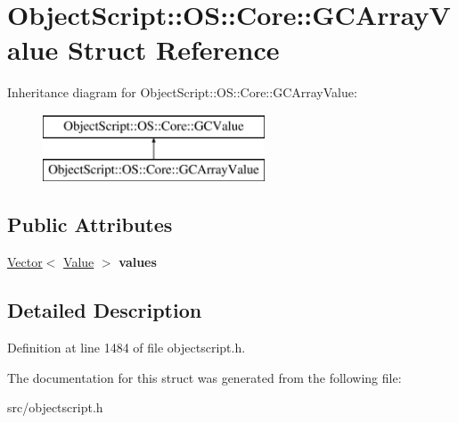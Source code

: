 \hypertarget{struct_object_script_1_1_o_s_1_1_core_1_1_g_c_array_value}{}\section{Object\+Script\+:\+:OS\+:\+:Core\+:\+:G\+C\+Array\+Value Struct Reference}
\label{struct_object_script_1_1_o_s_1_1_core_1_1_g_c_array_value}
Inheritance diagram for Object\+Script\+:\+:OS\+:\+:Core\+:\+:G\+C\+Array\+Value\+:\begin{figure}[H]
\begin{center}
\leavevmode
\includegraphics[height=2.000000cm]{struct_object_script_1_1_o_s_1_1_core_1_1_g_c_array_value}
\end{center}
\end{figure}
\subsection*{Public Attributes}
\begin{DoxyCompactItemize}
\item 
\hyperlink{struct_object_script_1_1_o_s_1_1_vector}{Vector}$<$ \hyperlink{struct_object_script_1_1_o_s_1_1_core_1_1_value}{Value} $>$ {\bfseries values}\hypertarget{struct_object_script_1_1_o_s_1_1_core_1_1_g_c_array_value_acbe276702726d52fe068c5518f9a7fb1}{}\label{struct_object_script_1_1_o_s_1_1_core_1_1_g_c_array_value_acbe276702726d52fe068c5518f9a7fb1}

\end{DoxyCompactItemize}


\subsection{Detailed Description}


Definition at line 1484 of file objectscript.\+h.



The documentation for this struct was generated from the following file\+:\begin{DoxyCompactItemize}
\item 
src/objectscript.\+h\end{DoxyCompactItemize}
